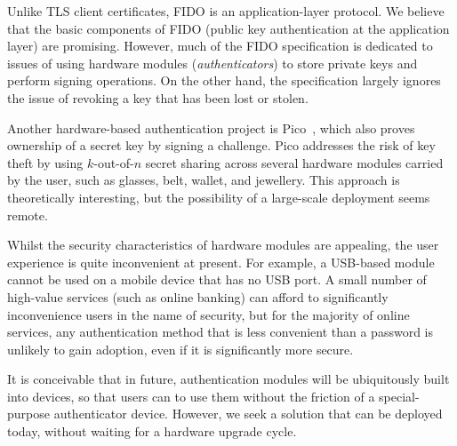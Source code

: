 Unlike TLS client certificates, FIDO is an application-layer protocol. We believe that the basic
components of FIDO (public key authentication at the application layer) are promising. However, much
of the FIDO specification is dedicated to issues of using hardware modules (\emph{authenticators})
to store private keys and perform signing operations. On the other hand, the specification largely
ignores the issue of revoking a key that has been lost or stolen.

Another hardware-based authentication project is Pico~\cite{Stajano11}, which also proves ownership
of a secret key by signing a challenge. Pico addresses the risk of key theft by using $k$-out-of-$n$
secret sharing across several hardware modules carried by the user, such as glasses, belt, wallet,
and jewellery. This approach is theoretically interesting, but the possibility of a large-scale
deployment seems remote.

Whilst the security characteristics of hardware modules are appealing, the user experience is quite
inconvenient at present. For example, a USB-based module cannot be used on a mobile device that has
no USB port. A small number of high-value services (such as online banking) can afford to
significantly inconvenience users in the name of security, but for the majority of online services,
any authentication method that is less convenient than a password is unlikely to gain adoption, even
if it is significantly more secure.

It is conceivable that in future, authentication modules will be ubiquitously built into devices, so
that users can to use them without the friction of a special-purpose authenticator device. However,
we seek a solution that can be deployed today, without waiting for a hardware upgrade cycle.
